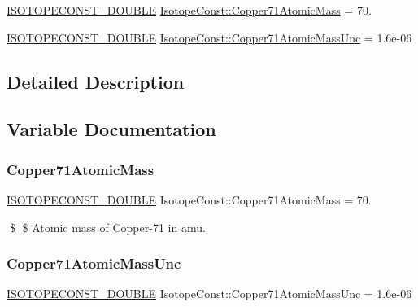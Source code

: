 \begin{DoxyCompactItemize}
\item 
\mbox{\hyperlink{group___isotope_const-_macros_ga8f45a7272ce02c0b4c65c44636ed719a}{I\+S\+O\+T\+O\+P\+E\+C\+O\+N\+S\+T\+\_\+\+D\+O\+U\+B\+LE}} \mbox{\hyperlink{group___isotope_const-_copper-_cu71_gac16e562ecf98f65ba8c6d530b223bd93}{Isotope\+Const\+::\+Copper71\+Atomic\+Mass}} = 70.
\item 
\mbox{\hyperlink{group___isotope_const-_macros_ga8f45a7272ce02c0b4c65c44636ed719a}{I\+S\+O\+T\+O\+P\+E\+C\+O\+N\+S\+T\+\_\+\+D\+O\+U\+B\+LE}} \mbox{\hyperlink{group___isotope_const-_copper-_cu71_gabc58a27b0758373b4724335e0436c77a}{Isotope\+Const\+::\+Copper71\+Atomic\+Mass\+Unc}} = 1.\+6e-\/06
\end{DoxyCompactItemize}


\subsection{Detailed Description}


\subsection{Variable Documentation}
\mbox{\label{group___isotope_const-_copper-_cu71_gac16e562ecf98f65ba8c6d530b223bd93}} 
\subsubsection{\texorpdfstring{Copper71\+Atomic\+Mass}{Copper71AtomicMass}}
{\footnotesize\ttfamily \mbox{\hyperlink{group___isotope_const-_macros_ga8f45a7272ce02c0b4c65c44636ed719a}{I\+S\+O\+T\+O\+P\+E\+C\+O\+N\+S\+T\+\_\+\+D\+O\+U\+B\+LE}} Isotope\+Const\+::\+Copper71\+Atomic\+Mass = 70.}

\$ \$ Atomic mass of Copper-\/71 in amu. \mbox{\label{group___isotope_const-_copper-_cu71_gabc58a27b0758373b4724335e0436c77a}} 
\subsubsection{\texorpdfstring{Copper71\+Atomic\+Mass\+Unc}{Copper71AtomicMassUnc}}
{\footnotesize\ttfamily \mbox{\hyperlink{group___isotope_const-_macros_ga8f45a7272ce02c0b4c65c44636ed719a}{I\+S\+O\+T\+O\+P\+E\+C\+O\+N\+S\+T\+\_\+\+D\+O\+U\+B\+LE}} Isotope\+Const\+::\+Copper71\+Atomic\+Mass\+Unc = 1.\+6e-\/06}

